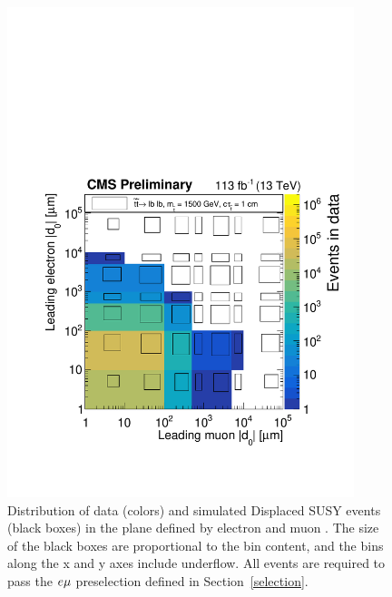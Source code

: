 \begin{figure}
\centering
\includegraphics[width=0.9\textwidth]{figures/results/d0vsd0_emu_withSignal_CMSPreliminary.pdf}
\caption{Distribution of data (colors) and simulated Displaced SUSY events (black boxes) in the plane defined by electron \ad and muon \ad. The size of the black boxes are proportional to the bin content, and the bins along the x and y axes include underflow. All events are required to pass the $e{\mu}$ preselection defined in Section~\ref{selection}.} 
\label{d0_discriminating_power}
\end{figure}